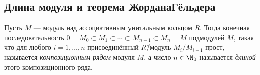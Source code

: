 \documentclass[
	extrafontsizes,
	11pt,
	hyphens,
]{memoir}
\begin{document}
%
%
%
%

\subsection{Длина модуля и теорема Жордана\namedash{}Гёльдера}

\begin{definition}
Пусть \(M\) --- модуль над ассоциативным унитальным кольцом \(R\).
Тогда конечная последовательность
\(0 = M_0 \subset M_1 \subset \cdots{} \subset M_{n-1} \subset M_n = M\)
подмодулей \(M\), такая что для любого \(i = 1, \dots{}, n\) присоединённый \(R\)\=/модуль \(M_i / M_{i-1}\) прост, называется \emph{композиционным рядом} модуля \(M\), а число \(n \in \N_0\) называется \emph{длиной} этого композиционного ряда.
\end{definition}
\end{document}
